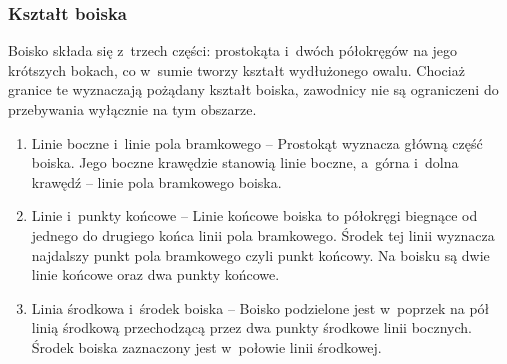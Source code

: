 \documentclass[12pt,a4paper]{article}
\begin{document}
\subsubsection{Kształt boiska}
Boisko składa się z~trzech części: prostokąta i~dwóch półokręgów na jego
krótszych bokach, co w~sumie tworzy kształt wydłużonego owalu. Chociaż
granice te wyznaczają pożądany kształt boiska, zawodnicy nie są
ograniczeni do przebywania wyłącznie na tym obszarze.
\begin{enumerate}
	\item{Linie boczne i~linie pola bramkowego} -- Prostokąt wyznacza
	      główną część boiska. Jego boczne krawędzie stanowią linie boczne, a~górna i~dolna krawędź -- linie pola bramkowego boiska.

	\item{Linie i~punkty końcowe} -- Linie końcowe boiska to
	      półokręgi biegnące od jednego do drugiego końca linii pola bramkowego.
	      Środek tej linii wyznacza najdalszy punkt pola bramkowego czyli punkt końcowy. Na boisku są dwie linie końcowe oraz dwa punkty końcowe.

	\item{Linia środkowa i~środek boiska} -- Boisko podzielone
	      jest w~poprzek na pół linią środkową przechodzącą przez dwa punkty środkowe linii bocznych. Środek boiska zaznaczony jest w~połowie linii środkowej.
\end{enumerate}
\end{document}
